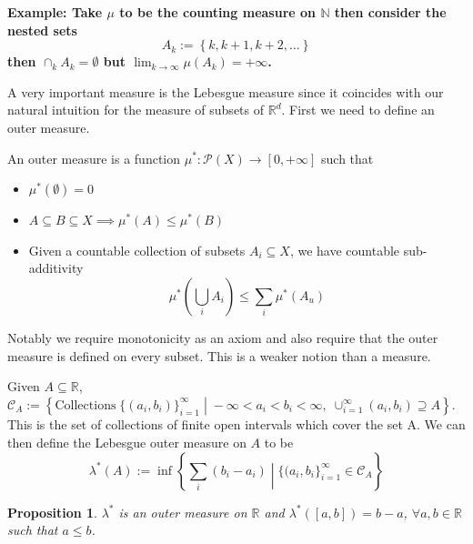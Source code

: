 \documentclass[11pt]{article}
\newcommand{\defeq}{:=}
\newcommand{\relmiddle}[1]{\mathrel{}\middle#1\mathrel{}}
\newcommand{\rmv}{\relmiddle|}
\newcommand{\pow}[1]{\mathcal{P}(#1)}
\newcommand{\R}{\mathbb{R}}
\newcommand{\N}{\mathbb{N}}
\newenvironment{defin}
	{\begin{mdframed}[backgroundcolor=white, roundcorner=5pt, linewidth=1pt]}
	{\end{mdframed}}
\newcommand{\mdf}[1]{{\color{red} #1}}
\newenvironment{eg}
{\begin{mdframed}[backgroundcolor=mylg,roundcorner=5pt,linewidth=0pt]\bfseries{Example:}\normalfont}
	{\end{mdframed}}
\newtheorem{prop}[theorem]{Proposition}
\begin{document}
\begin{eg}
Take $\mu$ to be the counting measure on $\N$ then consider the nested sets
\[
	A_k\defeq\left\{k, k+1, k+2, \dots \right\}
\]
then $\cap_k A_k = \emptyset$ but $\lim_{k\to\infty}\mu(A_k)=+\infty$.
\end{eg}

A very important measure is the Lebesgue measure since it coincides with our natural intuition for the measure of subsets of $\R^d$.
First we need to define an outer measure.
\begin{defin}
	An \mdf{outer measure} is a function $\mu^*:\pow{X}\to[0,+\infty]$ such that
	\begin{itemize}
		\item $\mu^*(\emptyset)=0$
		\item $A\subseteq B\subseteq X\implies \mu^*(A)\leq\mu^*(B)$
		\item Given a countable collection of subsets $A_i\subseteq X$, we have countable sub-additivity 
			$$\mu^*\left(\bigcup_i A_i\right)\leq\sum_i \mu^*(A_u)$$
	\end{itemize}
	Notably we require monotonicity as an axiom and also require that the outer measure is defined on every subset.
	This is a weaker notion than a measure.

	Given $A\subseteq\R$, $\mathcal{C}_A\defeq\left\{\text{Collections}\;\{(a_i,b_i)\}_{i=1}^\infty \rmv -\infty < a_i < b_i < \infty, \; \cup_{i=1}^\infty (a_i,b_i)\supseteq A \right\}$.
	This is the set of collections of finite open intervals which cover the set A.
	We can then define the \mdf{Lebesgue outer measure} on $A$ to be
	$$\lambda^*(A)\defeq\inf\left\{\sum_i(b_i-a_i) \rmv \{(a_i,b_i\}_{i=1}^\infty\in\mathcal{C}_A\right\}$$
\end{defin}
\begin{prop}
	$\lambda^*$ is an outer measure on $\R$ and $\lambda^*([a,b])=b-a$, $\forall a, b\in\R$ such that $a\leq b$.
\end{prop}
\end{document}
